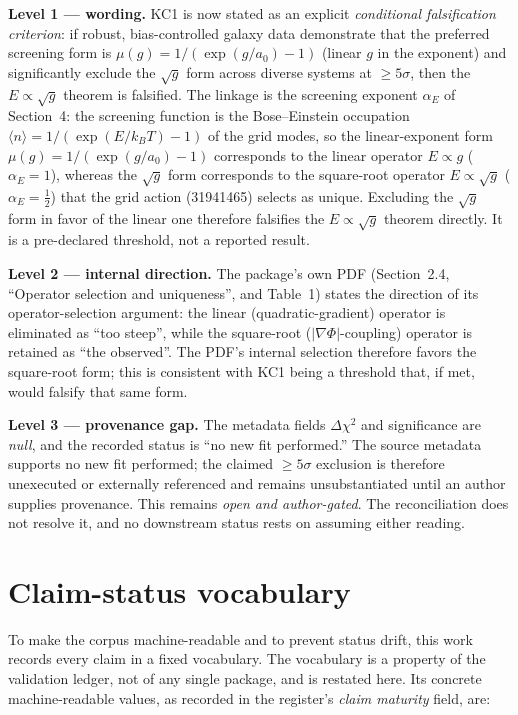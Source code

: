 \documentclass[11pt,a4paper]{article}
\begin{document}
\textbf{Level 1 --- wording.} KC1 is now stated as an explicit \emph{conditional falsification criterion}: if robust, bias-controlled galaxy data demonstrate that the preferred screening form is $\mu(g) = 1/(\exp(g/a_{0}) - 1)$ (linear $g$ in the exponent) and significantly exclude the $\sqrt{g}$ form across diverse systems at $\ge 5\sigma$, then the $E \propto \sqrt{g}$ theorem is falsified. The linkage is the screening exponent $\alpha_{E}$ of Section~4: the screening function is the Bose--Einstein occupation $\langle n\rangle = 1/(\exp(E/k_{B}T) - 1)$ of the grid modes, so the linear-exponent form $\mu(g) = 1/(\exp(g/a_{0}) - 1)$ corresponds to the linear operator $E \propto g$ ($\alpha_{E}=1$), whereas the $\sqrt{g}$ form corresponds to the square-root operator $E \propto \sqrt{g}$ ($\alpha_{E} = \tfrac{1}{2}$) that the grid action (31941465) selects as unique. Excluding the $\sqrt{g}$ form in favor of the linear one therefore falsifies the $E \propto \sqrt{g}$ theorem directly. It is a pre-declared threshold, not a reported result.

\textbf{Level 2 --- internal direction.} The package's own PDF (Section~2.4, ``Operator selection and uniqueness'', and Table~1) states the direction of its operator-selection argument: the linear (quadratic-gradient) operator is eliminated as ``too steep'', while the square-root ($|\nabla\Phi|$-coupling) operator is retained as ``the observed''. The PDF's internal selection therefore favors the square-root form; this is consistent with KC1 being a threshold that, if met, would falsify that same form.

\textbf{Level 3 --- provenance gap.} The metadata fields $\Delta\chi^{2}$ and significance are \emph{null}, and the recorded status is ``no new fit performed.'' The source metadata supports no new fit performed; the claimed $\ge 5\sigma$ exclusion is therefore unexecuted or externally referenced and remains unsubstantiated until an author supplies provenance. This remains \emph{open and author-gated}. The reconciliation does not resolve it, and no downstream status rests on assuming either reading.

\section{Claim-status vocabulary}

To make the corpus machine-readable and to prevent status drift, this work records every claim in a fixed vocabulary. The vocabulary is a property of the validation ledger, not of any single package, and is restated here. Its concrete machine-readable values, as recorded in the register's \emph{claim maturity} field, are:
\end{document}
